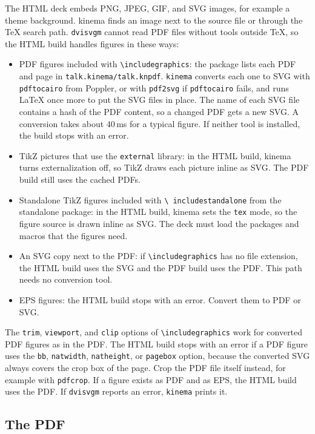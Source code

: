 \documentclass[11pt]{article}
\newcommand{\pkg}{\textsf{kinema}}
\newcommand{\cmd}[1]{\texttt{#1}}
\begin{document}
The HTML deck embeds PNG, JPEG, GIF, and SVG images, for example a theme
background. \pkg{} finds an image next to the source file or through the TeX
search path. \cmd{dvisvgm} cannot read PDF files without tools outside TeX, so
the HTML build handles figures in these ways:
\begin{itemize}
	\item PDF figures included with \cmd{\textbackslash includegraphics}: the
	      package lists each PDF and page in \cmd{talk.kinema/talk.knpdf}.
	      \cmd{kinema} converts each one to SVG with \cmd{pdftocairo} from Poppler,
	      or with \cmd{pdf2svg} if \cmd{pdftocairo} fails, and runs LaTeX once more
	      to put the SVG files in place. The name of each SVG file contains a hash of
	      the PDF content, so a changed PDF gets a new SVG. A conversion takes about
	      40\,ms for a typical figure. If neither tool is installed, the build stops
	      with an error.
	\item TikZ pictures that use the \cmd{external} library: in the HTML build,
	      \pkg{} turns externalization off, so TikZ draws each picture inline as SVG.
	      The PDF build still uses the cached PDFs.
	\item Standalone TikZ figures included with \cmd{\textbackslash
		      includestandalone} from the \textsf{standalone} package: in the HTML build,
	      \pkg{} sets the \cmd{tex} mode, so the figure source is drawn inline as
	      SVG. The deck must load the packages and macros that the figures need.
	\item An SVG copy next to the PDF: if \cmd{\textbackslash includegraphics}
	      has no file extension, the HTML build uses the SVG and the PDF build uses
	      the PDF. This path needs no conversion tool.
	\item EPS figures: the HTML build stops with an error. Convert them to PDF
	      or SVG.
\end{itemize}
The \cmd{trim}, \cmd{viewport}, and \cmd{clip} options of
\cmd{\textbackslash includegraphics} work for converted PDF figures as in the
PDF. The HTML build stops with an error if a PDF figure uses the \cmd{bb},
\cmd{natwidth}, \cmd{natheight}, or \cmd{pagebox} option, because the converted
SVG always covers the crop box of the page. Crop the PDF file itself instead,
for example with \cmd{pdfcrop}. If
a figure exists as PDF and as EPS, the HTML build uses the PDF. If \cmd{dvisvgm} reports an error,
\cmd{kinema} prints it.

\subsection{The PDF}
\end{document}
